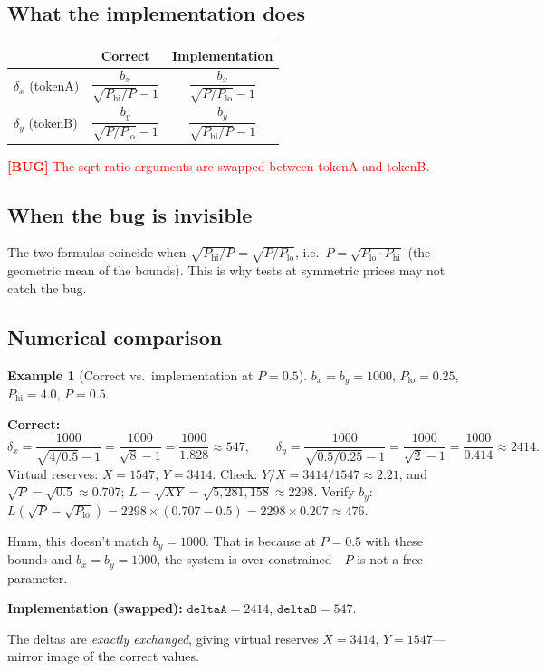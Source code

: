 \documentclass[11pt]{article}
\theoremstyle{definition}
\newtheorem{example}{Example}
\newcommand{\bug}[1]{\textcolor{red}{\textbf{[BUG]} #1}}
\begin{document}
\subsection{What the implementation does}

\begin{center}
\renewcommand{\arraystretch}{1.4}
\begin{tabular}{@{}lcc@{}}
\toprule
& \textbf{Correct} & \textbf{Implementation} \\
\midrule
$\delta_x$ (tokenA) &
  $\dfrac{b_x}{\sqrt{P_{\mathrm{hi}}/P} - 1}$ &
  $\dfrac{b_x}{\sqrt{P/P_{\mathrm{lo}}} - 1}$ \\[10pt]
$\delta_y$ (tokenB) &
  $\dfrac{b_y}{\sqrt{P/P_{\mathrm{lo}}} - 1}$ &
  $\dfrac{b_y}{\sqrt{P_{\mathrm{hi}}/P} - 1}$ \\
\bottomrule
\end{tabular}
\end{center}

\bug{The sqrt ratio arguments are swapped between tokenA and tokenB.}

\subsection{When the bug is invisible}

The two formulas coincide when $\sqrt{P_{\mathrm{hi}}/P} = \sqrt{P/P_{\mathrm{lo}}}$,
i.e.\ $P = \sqrt{P_{\mathrm{lo}} \cdot P_{\mathrm{hi}}}$ (the geometric mean of the
bounds).  This is why tests at symmetric prices may not catch the bug.

\subsection{Numerical comparison}

\begin{example}[Correct vs.\ implementation at $P = 0.5$]\label{ex:bug-deltas}
$b_x = b_y = 1000$, $P_{\mathrm{lo}} = 0.25$, $P_{\mathrm{hi}} = 4.0$, $P = 0.5$.

\medskip
\textbf{Correct:}
\[
\delta_x = \frac{1000}{\sqrt{4/0.5} - 1}
        = \frac{1000}{\sqrt{8} - 1}
        = \frac{1000}{1.828}
        \approx 547,
\qquad
\delta_y = \frac{1000}{\sqrt{0.5/0.25} - 1}
        = \frac{1000}{\sqrt{2} - 1}
        = \frac{1000}{0.414}
        \approx 2414.
\]
Virtual reserves: $X = 1547$, $Y = 3414$.
Check: $Y/X = 3414/1547 \approx 2.21$, and $\sqrt{P} = \sqrt{0.5} \approx 0.707$;
$L = \sqrt{XY} = \sqrt{5{,}281{,}158} \approx 2298$.
Verify $b_y$: $L(\sqrt{P} - \sqrt{P_{\mathrm{lo}}}) = 2298 \times (0.707 - 0.5) = 2298 \times 0.207 \approx 476$.

Hmm, this doesn't match $b_y = 1000$. That is because at $P = 0.5$ with these bounds and $b_x = b_y = 1000$, the system is over-constrained---$P$ is not a free parameter.

\medskip
\textbf{Implementation (swapped):}
$\texttt{deltaA} = 2414$, $\texttt{deltaB} = 547$.

The deltas are \emph{exactly exchanged}, giving virtual reserves
$X = 3414$, $Y = 1547$---mirror image of the correct values.
\end{example}
\end{document}
